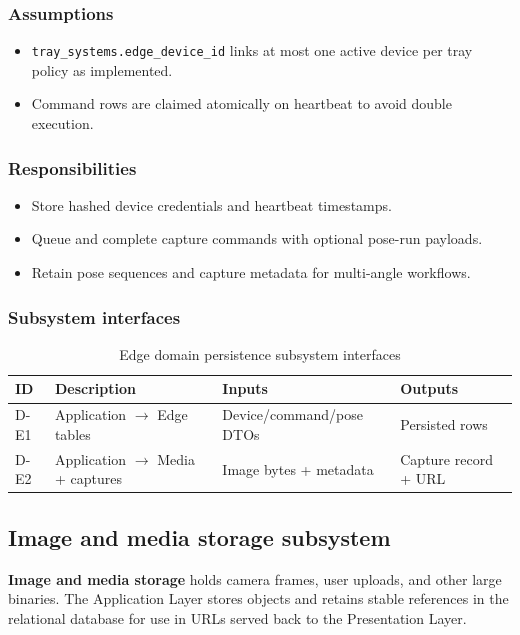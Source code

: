 \subsubsection{Assumptions}
\begin{itemize}
  \item \texttt{tray\_systems.edge\_device\_id} links at most one active device per tray policy as implemented.
  \item Command rows are claimed atomically on heartbeat to avoid double execution.
\end{itemize}

\subsubsection{Responsibilities}
\begin{itemize}
  \item Store hashed device credentials and heartbeat timestamps.
  \item Queue and complete capture commands with optional pose-run payloads.
  \item Retain pose sequences and capture metadata for multi-angle workflows.
\end{itemize}

\subsubsection{Subsystem interfaces}
\begin{table}[H]
\centering
\small
\begin{tabular}{|p{0.85cm}|p{3.5cm}|p{3.0cm}|p{3.5cm}|}
\hline
\textbf{ID} & \textbf{Description} & \textbf{Inputs} & \textbf{Outputs} \\
\hline
D-E1 & Application $\rightarrow$ Edge tables & Device/command/pose DTOs & Persisted rows \\
\hline
D-E2 & Application $\rightarrow$ Media + captures & Image bytes + metadata & Capture record + URL \\
\hline
\end{tabular}
\caption{Edge domain persistence subsystem interfaces}
\end{table}

\subsection{Image and media storage subsystem}

\textbf{Image and media storage} holds camera frames, user uploads, and other large binaries. The Application Layer stores objects and retains stable references in the relational database for use in URLs served back to the Presentation Layer.

